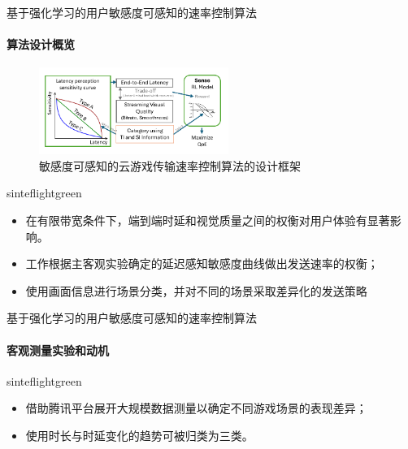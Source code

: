 \documentclass{beamer}
\begin{document}
\begin{frame}[fragile]{基于强化学习的用户敏感度可感知的速率控制算法}
\framesubtitle{算法设计概览}

\begin{figure}[ht]
    \centering
    \includegraphics[width=0.55\textwidth]{figures/chap03/teaser.pdf}
    \caption{敏感度可感知的云游戏传输速率控制算法的设计框架}
    \label{fig:teaser}
\end{figure}
\begin{colorblock}[black]{sinteflightgreen}{}
\begin{itemize}
    \item 在有限带宽条件下，端到端时延和视觉质量之间的权衡对用户体验有显著影响。
    \item 工作根据主客观实验确定的延迟感知敏感度曲线做出发送速率的权衡；
    \item 使用画面信息进行场景分类，并对不同的场景采取差异化的发送策略
\end{itemize}
            \end{colorblock}
\end{frame}

\begin{frame}[fragile]{基于强化学习的用户敏感度可感知的速率控制算法}
\framesubtitle{客观测量实验和动机}

            

            \begin{colorblock}[black]{sinteflightgreen}{}
            \begin{itemize}
            \item 借助腾讯平台展开大规模数据测量以确定不同游戏场景的表现差异；
            \item 使用时长与时延变化的趋势可被归类为三类。
        \end{itemize}
            \end{colorblock}
\end{frame}
\end{document}
